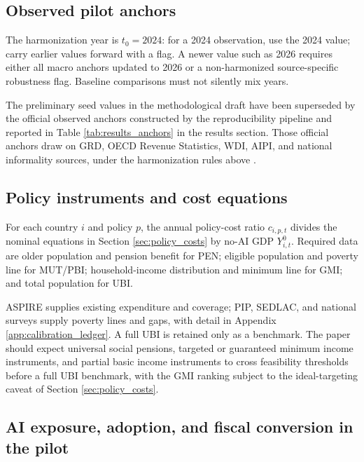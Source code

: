 \documentclass[11pt,a4paper]{article}
\begin{document}
\subsection{Observed pilot anchors}

The harmonization year is $t_0=2024$: for a 2024 observation, use the 2024 value; carry earlier values forward with a flag. A newer value such as 2026 requires either all macro anchors updated to 2026 or a non-harmonized source-specific robustness flag. Baseline comparisons must not silently mix years.

The preliminary seed values in the methodological draft have been superseded by the official observed anchors constructed by the reproducibility pipeline and reported in Table \ref{tab:results_anchors} in the results section. Those official anchors draw on GRD, OECD Revenue Statistics, WDI, AIPI, and national informality sources, under the harmonization rules above \citep{imf2024aipi,worldbank2026wdi,oecd2025revenue,oecd2025peru,worldbank2026humancapital,inechile2025ene,dane2026informalidad,inegi2024enoe}.

\subsection{Policy instruments and cost equations}

For each country $i$ and policy $p$, the annual policy-cost ratio $c_{i,p,t}$ divides the nominal equations in Section \ref{sec:policy_costs} by no-AI GDP $Y^0_{i,t}$. Required data are older population and pension benefit for PEN; eligible population and poverty line for MUT/PBI; household-income distribution and minimum line for GMI; and total population for UBI.

ASPIRE supplies existing expenditure and coverage; PIP, SEDLAC, and national surveys supply poverty lines and gaps, with detail in Appendix \ref{app:calibration_ledger}. A full UBI is retained only as a benchmark. The paper should expect universal social pensions, targeted or guaranteed minimum income instruments, and partial basic income instruments to cross feasibility thresholds before a full UBI benchmark, with the GMI ranking subject to the ideal-targeting caveat of Section \ref{sec:policy_costs}.

\subsection{AI exposure, adoption, and fiscal conversion in the pilot}
\end{document}
